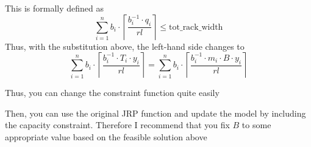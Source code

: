 \documentclass[
]{article}
\newenvironment{Shaded}{\begin{snugshade}}{\end{snugshade}}
\newcommand{\ControlFlowTok}[1]{\textcolor[rgb]{0.13,0.29,0.53}{\textbf{#1}}}
\newcommand{\DataTypeTok}[1]{\textcolor[rgb]{0.13,0.29,0.53}{#1}}
\newcommand{\KeywordTok}[1]{\textcolor[rgb]{0.13,0.29,0.53}{\textbf{#1}}}
\newcommand{\NormalTok}[1]{#1}
\newcommand{\OperatorTok}[1]{\textcolor[rgb]{0.81,0.36,0.00}{\textbf{#1}}}
\newcommand{\StringTok}[1]{\textcolor[rgb]{0.31,0.60,0.02}{#1}}
\begin{document}
This is formally defined as
\[ \sum_{i=1}^n b_i \cdot \left\lceil\frac{b^{-1}_i \cdot q_i}{rl} \right \rceil \leq \text{tot_rack_width}\]
Thus, with the substitution above, the left-hand side changes to
\[ \sum_{i=1}^n b_i \cdot \left\lceil\frac{b^{-1}_i \cdot T_i \cdot y_i}{rl} \right \rceil = \sum_{i=1}^n b_i \cdot \left\lceil\frac{b^{-1}_i \cdot m_i \cdot B \cdot y_i}{rl} \right \rceil\]

Thus, you can change the constraint function quite easily

\begin{Shaded}
\end{Shaded}

Then, you can use the original JRP function and update the model by
including the capacity constraint. Therefore I recommend that you fix
\(B\) to some appropriate value based on the feasible solution above
\end{document}

